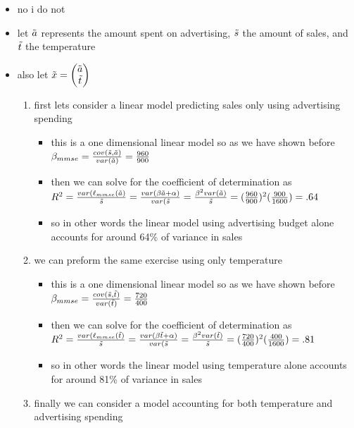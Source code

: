 \documentclass[12pt,twoside]{article}
\begin{document}
\begin{enumerate}
\begin{itemize}
    \color{blue}
    \item no i do not 
    \item let $\Tilde{a}$ represents the amount spent on advertising, $\Tilde{s}$ the amount of sales, and $\Tilde{t}$ the temperature 
    \item also let $\Tilde{x}=\begin{pmatrix}
        \Tilde{a}\\ \Tilde{t}
    \end{pmatrix}$
    \begin{enumerate}
        \item first lets consider a linear model predicting sales only using advertising spending 
        \begin{itemize}
            \item this is a one dimensional linear model so as we have shown before $\beta_{mmse}=\frac{cov(\Tilde{s}, \Tilde{a})}{var(\Tilde{a})}=\frac{960}{900}$
            \item then we can solve for the coefficient of determination as $R^2=\frac{var(\ell_{mmse}(\Tilde{a})}{\Tilde{s}}=\frac{var(\beta \Tilde{a}+\alpha)}{var(\Tilde{s}}=\frac{\beta^2 var(\Tilde{a})}{\Tilde{s}}=(\frac{960}{900})^2(\frac{900}{1600})=.64$
            \item so in other words the linear model using advertising budget alone accounts for around 64\% of variance in sales 
        \end{itemize}
        \item we can preform the same exercise using only temperature 
                \begin{itemize}
            \item this is a one dimensional linear model so as we have shown before $\beta_{mmse}=\frac{cov(\Tilde{s}, \Tilde{t})}{var(\Tilde{t})}=\frac{720}{400}$
            \item then we can solve for the coefficient of determination as $R^2=\frac{var(\ell_{mmse}(\Tilde{t})}{\Tilde{s}}=\frac{var(\beta \Tilde{t}+\alpha)}{var(\Tilde{s}}=\frac{\beta^2 var(\Tilde{t})}{\Tilde{s}}=(\frac{720}{400})^2(\frac{400}{1600})=.81$
            \item so in other words the linear model using temperature alone accounts for around 81\% of variance in sales 
        \end{itemize}
        \item finally we can consider a model accounting for both temperature and advertising spending 

\end{enumerate}
\end{itemize}
\end{enumerate}
\end{document}

